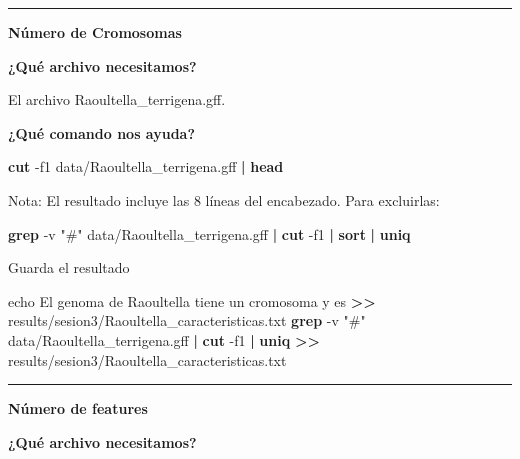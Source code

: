 \documentclass[
]{book}
\newenvironment{Shaded}{\begin{snugshade}}{\end{snugshade}}
\newcommand{\AttributeTok}[1]{\textcolor[rgb]{0.13,0.29,0.53}{#1}}
\newcommand{\BuiltInTok}[1]{#1}
\newcommand{\FunctionTok}[1]{\textcolor[rgb]{0.13,0.29,0.53}{\textbf{#1}}}
\newcommand{\KeywordTok}[1]{\textcolor[rgb]{0.13,0.29,0.53}{\textbf{#1}}}
\newcommand{\NormalTok}[1]{#1}
\newcommand{\OperatorTok}[1]{\textcolor[rgb]{0.81,0.36,0.00}{\textbf{#1}}}
\newcommand{\StringTok}[1]{\textcolor[rgb]{0.31,0.60,0.02}{#1}}
\begin{document}
\begin{center}\rule{0.5\linewidth}{0.5pt}\end{center}

\textbf{Número de Cromosomas}

\textbf{¿Qué archivo necesitamos?}

El archivo Raoultella\_terrigena.gff.

\textbf{¿Qué comando nos ayuda?}

\begin{Shaded}
\begin{Highlighting}[]
\FunctionTok{cut} \AttributeTok{{-}f1}\NormalTok{ data/Raoultella\_terrigena.gff }\KeywordTok{|} \FunctionTok{head}
\end{Highlighting}
\end{Shaded}

Nota: El resultado incluye las 8 líneas del encabezado. Para excluirlas:

\begin{Shaded}
\begin{Highlighting}[]
\FunctionTok{grep} \AttributeTok{{-}v} \StringTok{"\#"}\NormalTok{ data/Raoultella\_terrigena.gff }\KeywordTok{|} \FunctionTok{cut} \AttributeTok{{-}f1} \KeywordTok{|} \FunctionTok{sort} \KeywordTok{|} \FunctionTok{uniq}
\end{Highlighting}
\end{Shaded}

Guarda el resultado

\begin{Shaded}
\begin{Highlighting}[]
\BuiltInTok{echo} \StringTok{\textquotesingle{}El genoma de Raoultella tiene un cromosoma y es\textquotesingle{}} \OperatorTok{\textgreater{}\textgreater{}}\NormalTok{ results/sesion3/Raoultella\_caracteristicas.txt}
\FunctionTok{grep} \AttributeTok{{-}v} \StringTok{"\#"}\NormalTok{ data/Raoultella\_terrigena.gff }\KeywordTok{|} \FunctionTok{cut} \AttributeTok{{-}f1} \KeywordTok{|} \FunctionTok{uniq} \OperatorTok{\textgreater{}\textgreater{}}\NormalTok{ results/sesion3/Raoultella\_caracteristicas.txt}
\end{Highlighting}
\end{Shaded}

\begin{center}\rule{0.5\linewidth}{0.5pt}\end{center}

\textbf{Número de features}

\textbf{¿Qué archivo necesitamos?}
\end{document}
